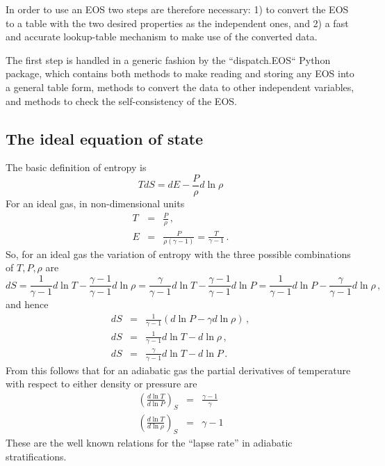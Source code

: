 \documentclass[paper=a4,fontsize=11pt]{scrartcl}
\numberwithin{equation}{section}		%
\numberwithin{figure}{section}			%
\numberwithin{table}{section}				%
\begin{document}
In order to use an EOS two steps are therefore necessary: 1) to convert the EOS to a table with the two desired properties as the independent ones, and 2) a fast and accurate lookup-table mechanism to make use of the converted data.

The first step is handled in a generic fashion by the ``dispatch.EOS`` Python package, which contains both methods to make reading and storing any EOS into a general table form, methods to convert the data to other independent variables, and methods to check the self-consistency of the EOS.

\subsection{The ideal equation of state}
The basic definition of entropy is
\begin{equation}
    T dS = d E - \frac{P}{\rho} d \ln\rho    
\end{equation}
For an ideal gas, in non-dimensional units
\begin{eqnarray}
    T &=& \frac{P}{\rho} \,,\\
    E &=& \frac{P}{\rho (\gamma-1)} = \frac{T}{\gamma-1} \,.
\end{eqnarray}
So, for an ideal gas the variation of entropy with the three possible combinations of $T, P, \rho$ are
\begin{equation}
    dS = \frac{1}{\gamma-1}d\ln T - \frac{\gamma-1}{\gamma-1} d \ln\rho  
       = \frac{\gamma}{\gamma-1} d\ln T - \frac{\gamma-1}{\gamma-1}d \ln P 
       = \frac{1}{\gamma-1} d\ln P -  \frac{\gamma}{\gamma-1} d \ln\rho\,,
\end{equation}
and hence
\begin{eqnarray}
    dS &=& \frac{1}{\gamma-1}(d\ln P  - \gamma  d \ln\rho) \,,\\
    dS &=& \frac{1}{\gamma-1} d\ln T - d \ln\rho \,,\\
    dS &=& \frac{\gamma}{\gamma-1} d\ln T - d\ln P \,. 
\end{eqnarray}
From this follows that for an adiabatic gas the partial derivatives of temperature with respect to either density or pressure are
\begin{eqnarray}
    \left(\frac{d \ln T}{d \ln P}\right)_S &=& \frac{\gamma-1}{\gamma} \\
    \left(\frac{d \ln T}{d \ln \rho}\right)_S &=& \gamma-1
\end{eqnarray}
These are the well known relations for the ``lapse rate'' in adiabatic stratifications.
\end{document}
